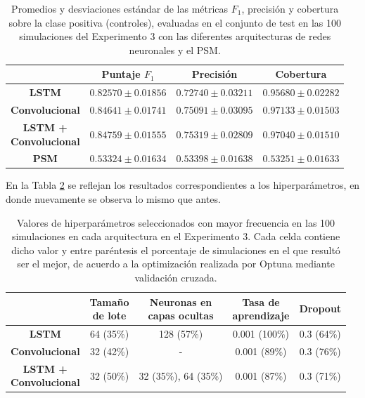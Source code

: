 \documentclass[../../main.tex]{subfiles}
\begin{document}
\begin{table}[H]
    \centering
    \renewcommand{\arraystretch}{1.2}
    \begin{tabular}{|c|c|c|c|}
        \hline
         & \textbf{Puntaje} \(F_1\) & \textbf{Precisión} & \textbf{Cobertura} \\ \hline\hline
        \textbf{LSTM}
            & $0.82570 \pm 0.01856$ & $0.72740 \pm 0.03211$ & $0.95680 \pm 0.02282$ \\ \hline
        \textbf{Convolucional}
            & $0.84641 \pm 0.01741$ & $0.75091 \pm 0.03095$ & $\mathbf{0.97133 \pm 0.01503}$ \\ \hline
        \makecell{\textbf{LSTM +} \\ \textbf{Convolucional}}
            & $\mathbf{0.84759 \pm 0.01555}$ & $\mathbf{0.75319 \pm 0.02809}$ & $0.97040 \pm 0.01510$ \\ \hline
        \textbf{PSM}
            & $0.53324 \pm 0.01634$ & $0.53398 \pm 0.01638$ & $0.53251 \pm 0.01633$ \\
        \hline
    \end{tabular}
    \caption{Promedios y desviaciones estándar de las métricas \(F_1\), precisión y
    cobertura sobre la clase positiva (controles), evaluadas en el conjunto de test en las
    100 simulaciones del Experimento 3 con las diferentes arquitecturas de redes
    neuronales y el PSM.}
    \label{tab:results_exp3}
\end{table}

En la Tabla \ref{tab:hyperparams_exp3} se reflejan los resultados correspondientes
a los hiperparámetros, en donde nuevamente se observa lo mismo que antes.

\begin{table}[ht]
    \centering
    \renewcommand{\arraystretch}{1.2}
    \begin{tabular}{|c|c|c|c|c|}
        \hline
            & \makecell{\textbf{Tamaño}\\\textbf{de lote}}
            & \makecell{\textbf{Neuronas en}\\\textbf{capas ocultas}}
            & \makecell{\textbf{Tasa de}\\\textbf{aprendizaje}}
            & \textbf{Dropout} \\ \hline\hline
        \textbf{LSTM}
            & 64 (35\%) & 128 (57\%) & 0.001 (100\%) & 0.3 (64\%) \\ \hline
        \textbf{Convolucional}
            & 32 (42\%) & -          & 0.001 (89\%)  & 0.3 (76\%) \\ \hline
        \makecell{\textbf{LSTM +}\\\textbf{Convolucional}}
            & 32 (50\%) & 32 (35\%), 64 (35\%) & 0.001 (87\%) & 0.3 (71\%) \\
        \hline
    \end{tabular}
    \caption{Valores de hiperparámetros seleccionados con mayor frecuencia en las 100
    simulaciones en cada arquitectura en el Experimento 3. Cada celda contiene dicho valor
    y entre paréntesis el porcentaje de simulaciones en el que resultó ser el mejor, de
    acuerdo a la optimización realizada por Optuna mediante validación cruzada.}
    \label{tab:hyperparams_exp3}
\end{table}
\end{document}

